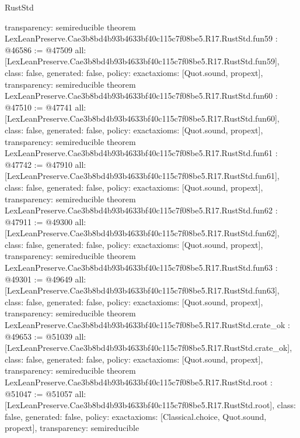 \begin{lexlean}{RustStd}
\begin{coremodule}
{  transparency: semireducible
}
theorem LexLeanPreserve.Cae3b8bd4b93b4633bf40c115c7f08be5.R17.RustStd.fun59 : @46586 := @47509 {
  all: [LexLeanPreserve.Cae3b8bd4b93b4633bf40c115c7f08be5.R17.RustStd.fun59],
  class: false,
  generated: false,
  policy: exact{axioms: [Quot.sound, propext]},
  transparency: semireducible
}
theorem LexLeanPreserve.Cae3b8bd4b93b4633bf40c115c7f08be5.R17.RustStd.fun60 : @47510 := @47741 {
  all: [LexLeanPreserve.Cae3b8bd4b93b4633bf40c115c7f08be5.R17.RustStd.fun60],
  class: false,
  generated: false,
  policy: exact{axioms: [Quot.sound, propext]},
  transparency: semireducible
}
theorem LexLeanPreserve.Cae3b8bd4b93b4633bf40c115c7f08be5.R17.RustStd.fun61 : @47742 := @47910 {
  all: [LexLeanPreserve.Cae3b8bd4b93b4633bf40c115c7f08be5.R17.RustStd.fun61],
  class: false,
  generated: false,
  policy: exact{axioms: [Quot.sound, propext]},
  transparency: semireducible
}
theorem LexLeanPreserve.Cae3b8bd4b93b4633bf40c115c7f08be5.R17.RustStd.fun62 : @47911 := @49300 {
  all: [LexLeanPreserve.Cae3b8bd4b93b4633bf40c115c7f08be5.R17.RustStd.fun62],
  class: false,
  generated: false,
  policy: exact{axioms: [Quot.sound, propext]},
  transparency: semireducible
}
theorem LexLeanPreserve.Cae3b8bd4b93b4633bf40c115c7f08be5.R17.RustStd.fun63 : @49301 := @49649 {
  all: [LexLeanPreserve.Cae3b8bd4b93b4633bf40c115c7f08be5.R17.RustStd.fun63],
  class: false,
  generated: false,
  policy: exact{axioms: [Quot.sound, propext]},
  transparency: semireducible
}
theorem LexLeanPreserve.Cae3b8bd4b93b4633bf40c115c7f08be5.R17.RustStd.crate_ok : @49653 := @51039 {
  all: [LexLeanPreserve.Cae3b8bd4b93b4633bf40c115c7f08be5.R17.RustStd.crate_ok],
  class: false,
  generated: false,
  policy: exact{axioms: [Quot.sound, propext]},
  transparency: semireducible
}
theorem LexLeanPreserve.Cae3b8bd4b93b4633bf40c115c7f08be5.R17.RustStd.root : @51047 := @51057 {
  all: [LexLeanPreserve.Cae3b8bd4b93b4633bf40c115c7f08be5.R17.RustStd.root],
  class: false,
  generated: false,
  policy: exact{axioms: [Classical.choice, Quot.sound, propext]},
  transparency: semireducible
}


\end{coremodule}
\end{lexlean}

